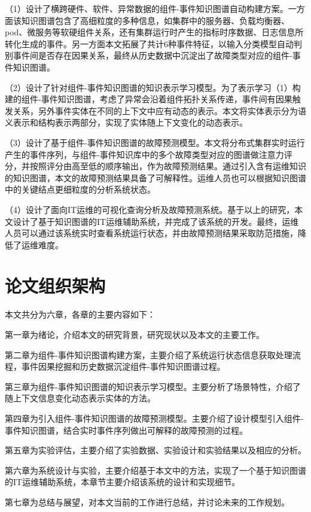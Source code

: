 （1）设计了横跨硬件、软件、异常数据的组件-事件知识图谱自动构建方案。一方面该知识图谱包含了高细粒度的多种信息，如集群中的服务器、负载均衡器、pod、微服务等软硬组件关系，还有集群运行时产生的指标时序数据、日志信息所转化生成的事件。另一方面本文拓展了共计6种事件特征，以输入分类模型自动判别事件间是否存在因果关系，最终从历史数据中沉淀出了故障类型对应的组件-事件知识图谱。

（2）设计了针对组件-事件知识图谱的知识表示学习模型。为了表示学习（1）构建的组件-事件知识图谱，考虑了异常会沿着组件拓扑关系传递，事件间有因果触发关系，另外事件实体在不同的上下文中应有动态的表示。本文将实体表示分为语义表示和结构表示两部分，实现了实体随上下文变化的动态表示。

（3）设计了基于组件-事件知识图谱的故障预测模型。本文将分布式集群实时运行产生的事件序列，与组件-事件知识库中的多个故障类型对应的图谱做注意力评分，并按照评分由高至低的顺序输出，作为故障预测结果。通过引入含有运维知识的知识图谱，本文的故障预测结果具备了可解释性。运维人员也可以根据知识图谱中的关键结点更细粒度的分析系统状态。

（4）设计了面向IT运维的可视化查询分析及故障预测系统。基于以上的研究，本文设计了基于知识图谱的IT运维辅助系统，并完成了该系统的开发。最终，运维人员可以通过该系统实时查看系统运行状态，并由故障预测结果采取防范措施，降低了运维难度。


\section{论文组织架构}
本文共分为六章，各章的主要内容如下：

第一章为绪论，介绍本文的研究背景，研究现状以及本文的主要工作。

第二章为组件-事件知识图谱构建方案，主要介绍了系统运行状态信息获取处理流程，事件因果挖掘和历史数据沉淀组件-事件知识图谱过程。

第三章为组件-事件知识图谱的知识表示学习模型。主要分析了场景特性，介绍了随上下文信息变化动态表示实体的方法。

第四章为引入组件-事件知识图谱的故障预测模型。主要介绍了设计模型引入组件-事件知识图谱，结合实时事件序列做出可解释的故障预测的过程。

第五章为实验评估，主要介绍了实验数据、实验设计和实验结果以及相应的分析。

第六章为系统设计与实验，主要介绍基于本文中的方法，实现了一个基于知识图谱的IT运维辅助系统，本章节主要介绍该系统的设计和实现细节。

第七章为总结与展望，对本文当前的工作进行总结，并讨论未来的工作规划。


